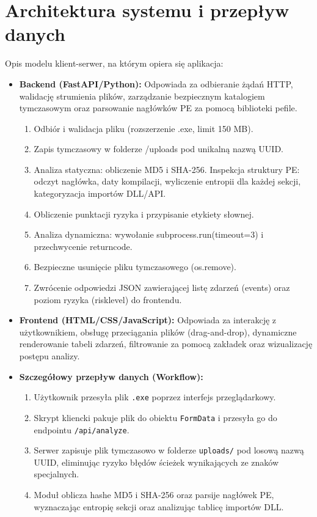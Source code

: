 \documentclass{article}
\begin{document}
\section{Architektura systemu i przepływ danych}
\label{sec:architektura}
Opis modelu klient-serwer, na którym opiera się aplikacja:
\begin{itemize}
\item \textbf{Backend (FastAPI/Python):} Odpowiada za odbieranie żądań HTTP, walidację strumienia plików, zarządzanie bezpiecznym katalogiem tymczasowym oraz parsowanie nagłówków PE za pomocą biblioteki pefile.
\begin{enumerate}
\item Odbiór i walidacja pliku (rozszerzenie .exe, limit 150 MB).   
\item Zapis tymczasowy w folderze /uploads pod unikalną nazwą UUID.   
\item Analiza statyczna: obliczenie MD5 i SHA-256.   Inspekcja struktury PE: odczyt nagłówka, daty kompilacji, wyliczenie entropii dla każdej sekcji, kategoryzacja importów DLL/API.   
\item Obliczenie punktacji ryzyka i przypisanie etykiety słownej.   
\item Analiza dynamiczna: wywołanie subprocess.run(timeout=3) i przechwycenie returncode.   
\item Bezpieczne usunięcie pliku tymczasowego (os.remove).   
\item Zwrócenie odpowiedzi JSON zawierającej listę zdarzeń (events) oraz poziom ryzyka (risklevel) do frontendu.  
\end{enumerate}
\item \textbf{Frontend (HTML/CSS/JavaScript):} Odpowiada za interakcję z użytkownikiem, obsługę przeciągania plików (drag-and-drop), dynamiczne renderowanie tabeli zdarzeń, filtrowanie za pomocą zakładek oraz wizualizację postępu analizy.
\item \textbf{Szczegółowy przepływ danych (Workflow):}
\begin{enumerate}
\item Użytkownik przesyła plik \texttt{.exe} poprzez interfejs przeglądarkowy.
\item Skrypt kliencki pakuje plik do obiektu \texttt{FormData} i przesyła go do endpointu \texttt{/api/analyze}.
\item Serwer zapisuje plik tymczasowo w folderze \texttt{uploads/} pod losową nazwą UUID, eliminując ryzyko błędów ścieżek wynikających ze znaków specjalnych.
\item Moduł oblicza hashe MD5 i SHA-256 oraz parsije nagłówek PE, wyznaczając entropię sekcji oraz analizując tablicę importów DLL.

\end{enumerate}
\end{itemize}
\end{document}
